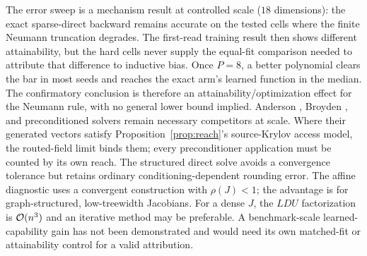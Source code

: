 The error sweep is a mechanism result at controlled scale ($18$ dimensions):
the exact sparse-direct backward remains accurate on the tested cells where
the finite Neumann truncation degrades. The first-read training result then
shows different attainability, but the hard cells never supply the equal-fit
comparison needed to attribute that difference to inductive bias. Once $P=8$,
a better polynomial clears the bar in most seeds and reaches the exact arm's
learned function in the median. The
confirmatory conclusion is therefore an attainability/optimization effect for
the Neumann rule, with no general lower bound implied. Anderson
\citep{anderson1965iterative}, Broyden \citep{broyden1965class}, and
preconditioned solvers remain necessary competitors at scale. Where their
generated vectors satisfy Proposition~\ref{prop:reach}'s source-Krylov access
model, the routed-field limit binds them; every preconditioner application must
be counted by its own reach. The structured
direct solve avoids a convergence tolerance but retains ordinary
conditioning-dependent rounding error. The affine diagnostic uses a
convergent construction with $\rho(J)<1$; the advantage is for
graph-structured, low-treewidth Jacobians. For a dense $J$, the $LDU$
factorization is $\mathcal{O}(n^3)$ and an
iterative method may be preferable. A benchmark-scale learned-capability gain
has not been demonstrated and would need its own matched-fit or attainability
control for a valid attribution.
